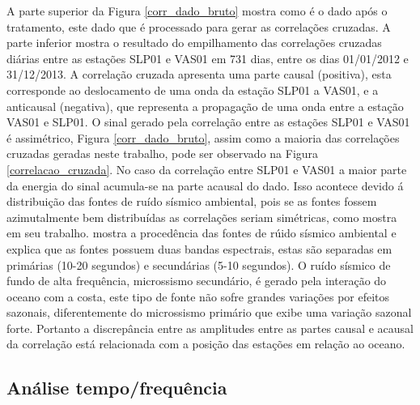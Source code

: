 A parte superior da Figura \ref{corr_dado_bruto} mostra como é o dado após o tratamento, este dado que é processado para gerar as correlações cruzadas. A parte inferior mostra o resultado do empilhamento das correlações cruzadas diárias entre as estações SLP01 e VAS01 em 731 dias, entre os dias 01/01/2012 e 31/12/2013.  A correlação cruzada apresenta uma parte causal (positiva), esta corresponde ao deslocamento de uma onda da estação SLP01 a VAS01, e a anticausal (negativa), que representa a propagação de uma onda entre a estação VAS01 e SLP01. O sinal gerado pela correlação entre as estações SLP01 e VAS01 é assimétrico, Figura \ref{corr_dado_bruto}, assim como a maioria das correlações cruzadas geradas neste trabalho, pode ser observado na Figura \ref{correlacao_cruzada}. No caso da correlação entre SLP01 e VAS01 a maior parte da energia do sinal acumula-se na parte acausal do dado. Isso acontece devido á distribuição das fontes de ruído sísmico ambiental, pois se as fontes fossem azimutalmente bem distribuídas as correlações seriam simétricas, como mostra \cite{stehly_study_2006} em seu trabalho. \cite{stehly_study_2006} mostra a procedência das fontes de rúido sísmico ambiental e explica que as fontes possuem duas bandas espectrais, estas são separadas em primárias (10-20 segundos) e secundárias (5-10 segundos). O ruído sísmico de fundo  de alta frequência, microssismo secundário, é gerado pela interação do oceano com a costa, este tipo de fonte não sofre grandes variações por efeitos sazonais, diferentemente do microssismo primário que exibe uma variação sazonal forte. Portanto a discrepância entre as amplitudes entre as partes causal e acausal da correlação está relacionada com a posição das estações em relação ao oceano. 


\subsection{Análise tempo/frequência}

